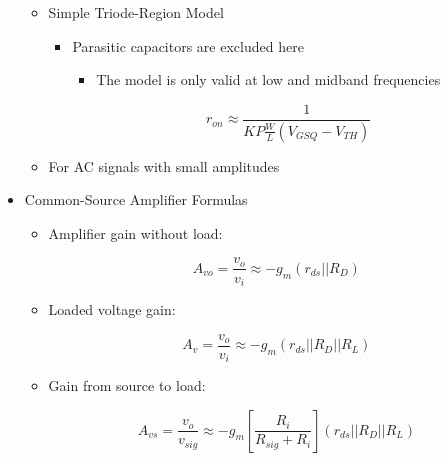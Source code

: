 \begin{itemize}
    \begin{itemize}

      \item Simple Triode-Region Model

        \begin{itemize}

          \item Parasitic capacitors are excluded here

            \begin{itemize}

              \item The model is only valid at low and midband frequencies

            \end{itemize}

            $$r_{on}\approx\frac{1}{KP\frac{W}{L}(V_{GSQ}-V_{TH})}$$

        \end{itemize}

      \item For AC signals with small amplitudes

    \end{itemize}

  \item Common-Source Amplifier Formulas

    \begin{itemize}

      \item Amplifier gain without load:

        $$A_{vo}=\frac{v_o}{v_i}\approx -g_m(r_{ds}||R_D)$$

      \item Loaded voltage gain:

        $$A_{v}=\frac{v_o}{v_i}\approx -g_m(r_{ds}||R_D||R_L)$$

      \item Gain from source to load:

        $$A_{vs}=\frac{v_o}{v_{sig}}\approx -g_m\left[ \frac{R_i}{R_{sig}+R_i} \right](r_{ds}||R_D||R_L)$$

    \end{itemize}

\end{itemize}



